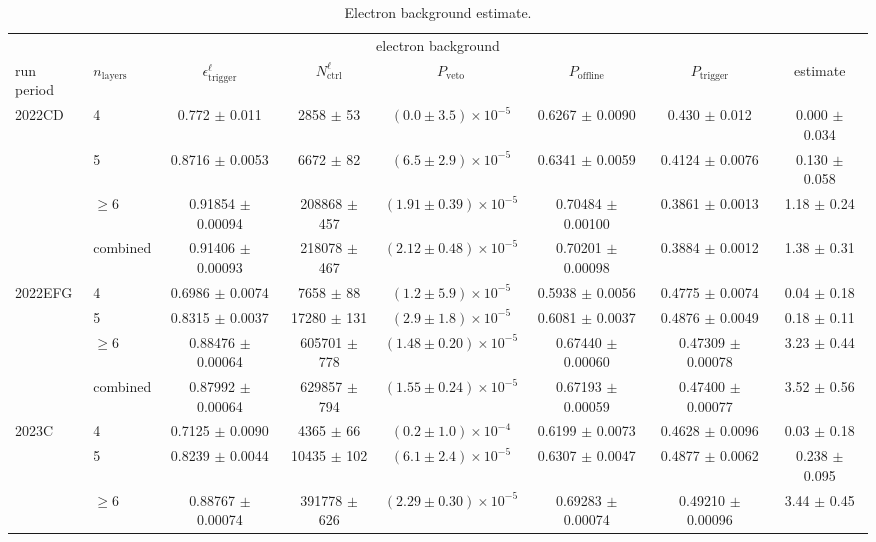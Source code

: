 \begin{table}
\centering
\caption{Electron background estimate.}
\label{tab:lepton_background_estimate}
\begin{tiny}
\begin{tabular}{llcccccc}
\hline
\multicolumn{8}{c}{electron background} \\
run period & $n_{\mathrm{layers}}$ & $\epsilon_{\mathrm{trigger}}^{\ell}$ & $N_{\mathrm{ctrl}}^{\ell}$ & $P_{\mathrm{veto}}$ & $P_{\mathrm{offline}}$ & $P_{\mathrm{trigger}}$ & estimate \\
\hline
\multirow{4}{*}{2022CD} & 4 & 0.772 $\pm$ 0.011 & 2858 $\pm$ 53 & $(0.0 \pm 3.5) \times 10^{-5}$ & 0.6267 $\pm$ 0.0090 & 0.430 $\pm$ 0.012 & 0.000 $\pm$ 0.034 \\
 & 5 & 0.8716 $\pm$ 0.0053 & 6672 $\pm$ 82 & $(6.5 \pm 2.9) \times 10^{-5}$ & 0.6341 $\pm$ 0.0059 & 0.4124 $\pm$ 0.0076 & 0.130 $\pm$ 0.058 \\
 & $\geq 6$ & 0.91854 $\pm$ 0.00094 & 208868 $\pm$ 457 & $(1.91 \pm 0.39) \times 10^{-5}$ & 0.70484 $\pm$ 0.00100 & 0.3861 $\pm$ 0.0013 & 1.18 $\pm$ 0.24 \\
 & combined & 0.91406 $\pm$ 0.00093 & 218078 $\pm$ 467 & $(2.12 \pm 0.48) \times 10^{-5}$ & 0.70201 $\pm$ 0.00098 & 0.3884 $\pm$ 0.0012 & 1.38 $\pm$ 0.31 \\
\hline
\multirow{4}{*}{2022EFG} & 4 & 0.6986 $\pm$ 0.0074 & 7658 $\pm$ 88 & $(1.2 \pm 5.9) \times 10^{-5}$ & 0.5938 $\pm$ 0.0056 & 0.4775 $\pm$ 0.0074 & 0.04 $\pm$ 0.18 \\
 & 5 & 0.8315 $\pm$ 0.0037 & 17280 $\pm$ 131 & $(2.9 \pm 1.8) \times 10^{-5}$ & 0.6081 $\pm$ 0.0037 & 0.4876 $\pm$ 0.0049 & 0.18 $\pm$ 0.11 \\
 & $\geq 6$ & 0.88476 $\pm$ 0.00064 & 605701 $\pm$ 778 & $(1.48 \pm 0.20) \times 10^{-5}$ & 0.67440 $\pm$ 0.00060 & 0.47309 $\pm$ 0.00078 & 3.23 $\pm$ 0.44 \\
 & combined & 0.87992 $\pm$ 0.00064 & 629857 $\pm$ 794 & $(1.55 \pm 0.24) \times 10^{-5}$ & 0.67193 $\pm$ 0.00059 & 0.47400 $\pm$ 0.00077 & 3.52 $\pm$ 0.56 \\
\hline
\multirow{4}{*}{2023C} & 4 & 0.7125 $\pm$ 0.0090 & 4365 $\pm$ 66 & $(0.2 \pm 1.0) \times 10^{-4}$ & 0.6199 $\pm$ 0.0073 & 0.4628 $\pm$ 0.0096 & 0.03 $\pm$ 0.18 \\
 & 5 & 0.8239 $\pm$ 0.0044 & 10435 $\pm$ 102 & $(6.1 \pm 2.4) \times 10^{-5}$ & 0.6307 $\pm$ 0.0047 & 0.4877 $\pm$ 0.0062 & 0.238 $\pm$ 0.095 \\
 & $\geq 6$ & 0.88767 $\pm$ 0.00074 & 391778 $\pm$ 626 & $(2.29 \pm 0.30) \times 10^{-5}$ & 0.69283 $\pm$ 0.00074 & 0.49210 $\pm$ 0.00096 & 3.44 $\pm$ 0.45 \\

\end{tabular}
\end{tiny}
\end{table}
